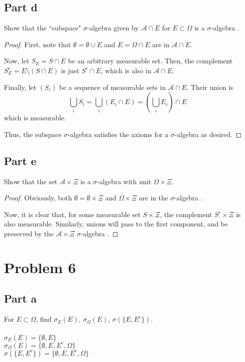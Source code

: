 \documentclass[paper=a4, fontsize=11pt]{scrartcl} %
\numberwithin{equation}{section} %
\numberwithin{figure}{section} %
\numberwithin{table}{section} %
\newcommand{\sigalg}{$\sigma$-algebra }
\begin{document}
\subsection*{Part d}
Show that the ``subspace" \sigalg given by $\mathscr{A}\cap E$ for $E\subset \Omega$
is a \sigalg.
\\
\begin{proof}
First, note that $\emptyset = \emptyset \cup E$ and $E = \Omega \cap E$ are in $\mathscr{A}\cap E$.

Now, let $S_E = S \cap E$ be an arbitrary measurable set. Then, the complement $S_E^c = E\setminus (S\cap E)$
is just $S^c\cap E$, which is also in $\mathscr{A}\cap E$.

Finally, let $(S_i)$ be a sequence of measurable sets in $\mathscr{A}\cap E$. Their union is
\[
\bigcup_i S_i = \bigcup_i (E_i\cap E) = (\bigcup_i E_i) \cap E
\]
which is measurable.

Thus, the subspace \sigalg satisfies the axioms for a \sigalg as desired.

\end{proof}

\subsection*{Part e}
Show that the set $\mathscr{A}\times\Xi$ is a \sigalg with unit $\Omega\times\Xi$.
\\
\begin{proof}
Obviously, both $\emptyset = \emptyset\times\Xi$ and $\Omega\times\Xi$ are in the \sigalg.

Now, it is clear that, for some measurable set $S\times\Xi$, the complement $S^c\times\Xi$ is
also measurable. Similarly, unions will pass to the first component, and be preserved by the
$\mathscr{A}\times\Xi$ \sigalg.


\end{proof}




\section*{Problem 6}
\subsection*{Part a}
For $E\subset\Omega$, find $\sigma_E(E)$, $\sigma_{\Omega}(E)$, $\sigma(\{E,E^c\})$.
\\
\\
$\sigma_E(E) = \{\emptyset, E\}$\\
$\sigma_{\Omega}(E) = \{\emptyset, E, E^c, \Omega\}$\\
$\sigma(\{E,E^c\}) = \{\emptyset, E, E^c, \Omega\}$
\end{document}

